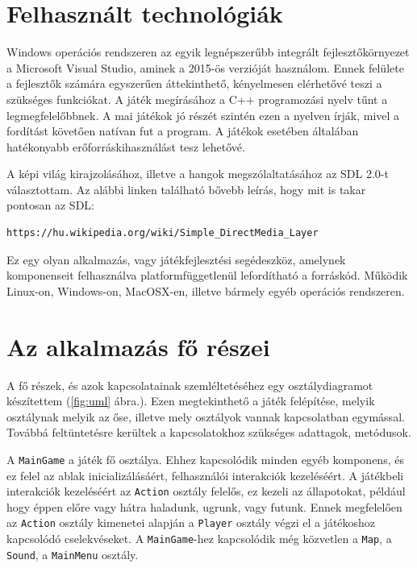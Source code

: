 \label{Chap:komponensek}

\section{Felhasznált technológiák}


Windows operációs rendszeren az egyik legnépszerűbb integrált fejlesztőkörnyezet a Microsoft Visual Studio, aminek a 2015-ös verzióját használom. Ennek felülete a fejlesztők számára egyszerűen áttekinthető, kényelmesen elérhetővé teszi a szükséges funkciókat. A játék megírásához a C++ programozási nyelv tűnt a legmegfelelőbbnek. A mai játékok jó részét szintén ezen a nyelven írják, mivel a fordítást követően natívan fut a program. A játékok esetében általában hatékonyabb erőforráskihasználást tesz lehetővé.

A képi világ kirajzolásához, illetve a hangok megszólaltatásához az SDL 2.0-t választottam. Az alábbi linken található bővebb leírás, hogy mit is takar pontosan az SDL:

\begin{verbatim}
https://hu.wikipedia.org/wiki/Simple_DirectMedia_Layer
\end{verbatim}

Ez egy olyan alkalmazás, vagy játékfejlesztési segédeszköz, amelynek komponenseit felhasználva platformfüggetlenül lefordítható a forráskód. Működik Linux-on, Windows-on, MacOSX-en, illetve bármely egyéb operációs rendszeren.

\section{Az alkalmazás fő részei}

A fő részek, és azok kapcsolatainak szemléltetéséhez egy osztálydiagramot készítettem (\ref{fig:uml} ábra.). Ezen megtekinthető a játék felépítése, melyik osztálynak melyik az őse, illetve mely osztályok vannak kapcsolatban egymással. Továbbá feltüntetésre kerültek a kapcsolatokhoz szükséges adattagok, metódusok.

A \texttt{MainGame} a játék fő osztálya. Ehhez kapcsolódik minden egyéb komponens, és ez felel az ablak inicializálásáért, felhasználói interakciók kezeléséért. A játékbeli interakciók kezeléséért az \texttt{Action} osztály felelős, ez kezeli az állapotokat, például hogy éppen előre vagy hátra haladunk, ugrunk, vagy futunk. Ennek megfelelően az \texttt{Action} osztály kimenetei alapján a \texttt{Player} osztály végzi el a játékoshoz kapcsolódó cselekvéseket. A \texttt{MainGame}-hez kapcsolódik még közvetlen a \texttt{Map}, a \texttt{Sound}, a \texttt{MainMenu} osztály. 

